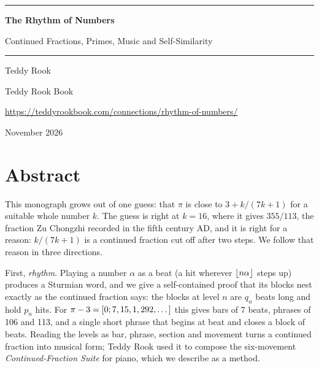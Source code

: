 \begin{titlingpage}
\centering
\vspace*{1.2in}
{\color{racing}\rule{\textwidth}{1.2pt}}\par\vspace{0.35in}
{\fontsize{30}{36}\selectfont\bfseries\color{racing} The Rhythm of Numbers\par}
\vspace{0.2in}
{\Large Continued Fractions, Primes, Music and Self-Similarity\par}
\vspace{0.35in}
{\color{racing}\rule{\textwidth}{1.2pt}}\par
\vspace{0.9in}
{\Large Teddy Rook\par}
\vspace{0.15in}
{\large Teddy Rook Book\par}
{\normalsize\url{https://teddyrookbook.com/connections/rhythm-of-numbers/}\par}
\vfill
{\large November 2026\par}
\vspace{0.4in}
\end{titlingpage}

\chapter*{Abstract}

This monograph grows out of one guess: that $\pi$ is close to $3 + k/(7k+1)$ for a suitable whole number $k$. The guess is right at $k = 16$, where it gives $355/113$, the fraction Zu Chongzhi recorded in the fifth century AD, and it is right for a reason: $k/(7k+1)$ is a continued fraction cut off after two steps. We follow that reason in three directions.

First, \emph{rhythm}. Playing a number $\alpha$ as a beat (a hit wherever $\left\lfloor n\alpha\right\rfloor$ steps up) produces a Sturmian word, and we give a self-contained proof that its blocks nest exactly as the continued fraction says: the blocks at level $n$ are $q_n$ beats long and hold $p_n$ hits. For $\pi - 3 = [0; 7, 15, 1, 292, \dots]$ this gives bars of 7 beats, phrases of 106 and 113, and a single short phrase that begins at beat \ShortStart{} and closes a block of \BlockEnd{} beats. Reading the levels as bar, phrase, section and movement turns a continued fraction into musical form; Teddy Rook used it to compose the six-movement \emph{Continued-Fraction Suite} for piano, which we describe as a method.

